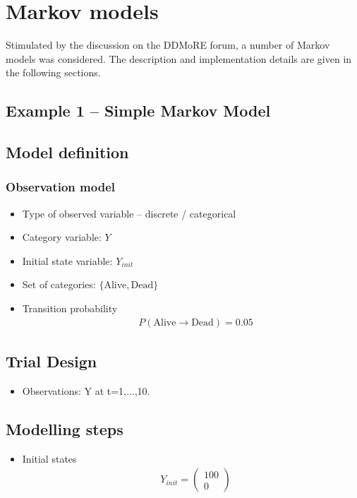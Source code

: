 \section{Markov models}
\label{sec:markovModels}
Stimulated by the discussion on the DDMoRE forum, a number of Markov models
was considered. The description and implementation details are given in the following 
sections. 

\subsection{Example 1 -- Simple Markov Model}
\label{subsec:exp1}

\subsection*{Model definition}
\subsubsection*{Observation model}

\begin{itemize}
\item
Type of observed variable -- discrete / categorical
\item
Category variable: $Y$
\item
Initial state variable: $Y_{init}$
\item
Set of categories: $\{\mbox{Alive}, \mbox{Dead}\}$
\item
Transition probability
\begin{align}
& P(\mbox{Alive} \rightarrow \mbox{Dead}) = 0.05 \nonumber
\end{align}
\end{itemize}

\subsection*{Trial Design}

\begin{itemize}
\item
Observations: Y at t=1,...,10.
\end{itemize}


\subsection*{Modelling steps}

\begin{itemize}
\item
Initial states
\begin{align}
& Y_{init} = \left( \begin{array}{c} 100 \\ 0 \end{array} \right) \nonumber
\end{align}
\end{itemize}


